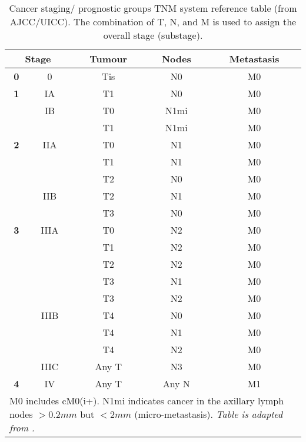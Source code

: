         \begin{table}[!h]
        \centering
        \tiny
        \caption[Cancer staging/ prognostic groups TNM system reference table (from AJCC/UICC)]{Cancer staging/ prognostic groups TNM system reference table (from AJCC/UICC). The combination of T, N, and M is used to assign the  overall stage (substage).}
        \label{table:tnmstage}
        \begin{tabular}{c|c|c|c|c}
        \multicolumn{2}{c|}{\textbf{\small Stage}} & \textbf{Tumour} & \textbf{Nodes} & \textbf{Metastasis} \\ \hline
        \textbf{0} & 0 & Tis & N0 & M0 \\ \hline
        \textbf{1} & IA & T1 & N0 & M0 \\ \hline
        \textbf{} & IB & T0 & N1mi & M0 \\ \cline{2-5} 
        \textbf{} &  & T1 & N1mi & M0 \\ \hline
        \textbf{2} & IIA & T0 & N1 & M0 \\ \hline
        \textbf{} &  & T1 & N1 & M0 \\ \cline{2-5} 
        \textbf{} &  & T2 & N0 & M0 \\ \cline{2-5} 
        \textbf{} & IIB & T2 & N1 & M0 \\ \cline{2-5} 
        \textbf{} &  & T3 & N0 & M0 \\ \hline
        \textbf{3} & IIIA & T0 & N2 & M0 \\ \hline
         &  & T1 & N2 & M0 \\ \cline{2-5} 
         &  & T2 & N2 & M0 \\ \cline{2-5} 
         &  & T3 & N1 & M0 \\ \cline{2-5} 
         &  & T3 & N2 & M0 \\ \cline{2-5} 
         & IIIB & T4 & N0 & M0 \\ \cline{2-5} 
         &  & T4 & N1 & M0 \\ \cline{2-5} 
         &  & T4 & N2 & M0 \\ \cline{2-5} 
         & IIIC & Any T & N3 & M0 \\ \hline
        \textbf{4} & IV & Any T & Any N & M1 \\ \hline
        
        \hline
        \multicolumn{5}{l}{%
          \begin{minipage}{5cm}%
            \tiny M0 includes cM0(i+). N1mi indicates cancer in the axillary lymph nodes  $>0.2mm$ but $<2mm$ (micro-metastasis). \textit{Table is adapted from \cite{Giuliano2017}.} 
          \end{minipage}%
        }\\
        \end{tabular}
        \end{table}


